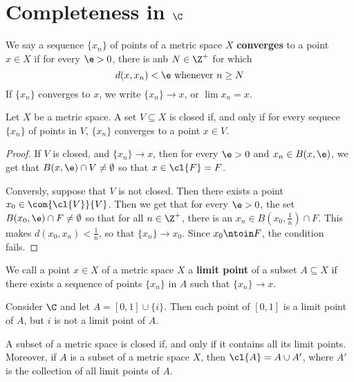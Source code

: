 \section{Completeness in $\C$}

\begin{definition}
    We say a sequence $\{x_n\}$ of points of a metric space $X$  \textbf{converges}
    to a point $x \in X$ if for every  $\e>0$, there is anb  $N \in \Z^+$ for which
    \begin{equation*}
        d(x,x_n)<\e \text{ whenever } n \geq N
    \end{equation*}
    If $\{x_n\}$ converges to $x$, we write  $\{x_n\} \xrightarrow{} x$, or
    $\lim{x_n}=x$.
\end{definition}

\begin{lemma}\label{2.3.1}
    Let $X$ be a metric space. A set  $V \subseteq X$ is closed if, and only if
    for every sequece  $\{x_n\}$ of points in $V$,  $\{x_n\}$ converges to a point
    $x \in V$.
\end{lemma}
\begin{proof}
    If $V$ is closed, and  $\{x_n\} \xrightarrow{} x$, then for every $\e>0$ and
     $x_n \in B(x,\e)$, we get that $B(x,\e) \cap V \neq \emptyset$ so that $x
     \in \cl{F}=F$.

     Conversly, suppose that $V$ is not closed. Then there exists a point  $x_0
     \in \com{\cl{V}}{V}$. Then we get that for every $\e>0$, the set
     $B(x_0,\e) \cap F \neq \emptyset$ so that for all $n \in \Z^+$, there is an
      $x_n \in B(x_0, \frac{1}{n}) \cap F$. This makes $d(x_0,x_n)<\frac{1}{n}$,
      so that $\{x_n\} \xrightarrow{} x_0$. Since $x_0 \ntoin F$, the condition
      fails.
\end{proof}

\begin{definition}
    We call a point $x \in X$ of a metric space  $X$ a  \textbf{limit point} of
    a subset $A \subseteq X$ if there exists a sequence of points  $\{x_n\}$ in
    $A$ such that  $\{x_n\} \xrightarrow{} x$.
\end{definition}

\begin{example}\label{example_2.7}
    Consider $\C$ and let  $A=[0,1] \cup \{i\}$. Then each point of $[0,1]$ is a
    limit point of $A$, but  $i$ is not a limit point of $A$.
\end{example}

\begin{lemma}\label{2.3.2}
    A subset of a metric space is closed if, and only if it contains all its
    limit points. Moreover, if $A$ is a subset of a metric space  $X$, then
    $\cl{A}=A \cup A'$, where $A'$ is the collection of all limit points of $A$.
\end{lemma}

